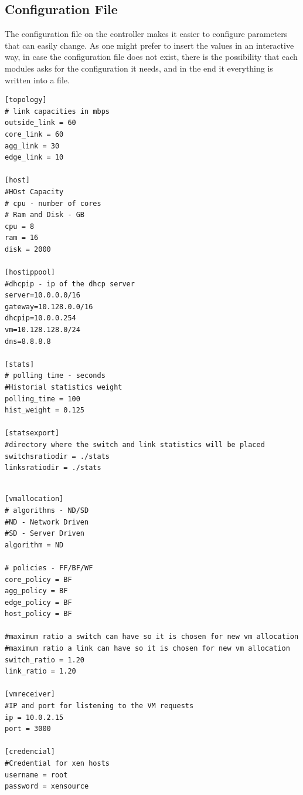 \documentclass[12pt,english,oneside]{book}
\begin{document}
\subsection{Configuration File}
\hspace{0.6cm}

The configuration file on the controller makes it easier to configure parameters that can easily change.
As one might prefer to insert the values in an interactive way, in case the configuration file does not exist, there is the possibility that each modules asks for the configuration it needs, and in the end it everything is written into a file.

\begin{minipage}{.5\textwidth}
  \begin{lstlisting}
[topology]
# link capacities in mbps
outside_link = 60
core_link = 60
agg_link = 30
edge_link = 10

[host]
#HOst Capacity
# cpu - number of cores
# Ram and Disk - GB
cpu = 8
ram = 16
disk = 2000

[hostippool]
#dhcpip - ip of the dhcp server
server=10.0.0.0/16
gateway=10.128.0.0/16
dhcpip=10.0.0.254
vm=10.128.128.0/24
dns=8.8.8.8

[stats]
# polling time - seconds
#Historial statistics weight
polling_time = 100
hist_weight = 0.125

[statsexport]
#directory where the switch and link statistics will be placed
switchsratiodir = ./stats
linksratiodir = ./stats
\end{lstlisting}
\end{minipage}%
\begin{minipage}{.5\textwidth}
    \begin{lstlisting}

[vmallocation]
# algorithms - ND/SD
#ND - Network Driven
#SD - Server Driven
algorithm = ND

# policies - FF/BF/WF
core_policy = BF
agg_policy = BF
edge_policy = BF
host_policy = BF

#maximum ratio a switch can have so it is chosen for new vm allocation
#maximum ratio a link can have so it is chosen for new vm allocation
switch_ratio = 1.20
link_ratio = 1.20

[vmreceiver]
#IP and port for listening to the VM requests
ip = 10.0.2.15
port = 3000

[credencial]
#Credential for xen hosts
username = root
password = xensource
\end{lstlisting}
\end{minipage}%
\end{document}
